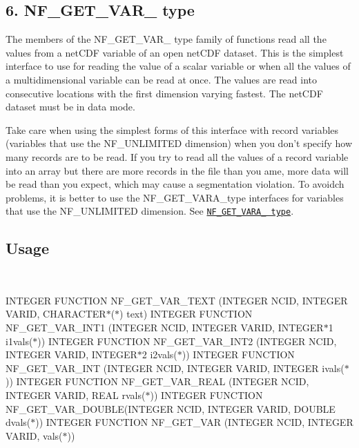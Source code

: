 \subsection*{6. N\+F\+\_\+\+G\+E\+T\+\_\+\+V\+A\+R\+\_\+ type }

The members of the N\+F\+\_\+\+G\+E\+T\+\_\+\+V\+A\+R\+\_\+ type family of functions read all the values from a net\+C\+DF variable of an open net\+C\+DF dataset. This is the simplest interface to use for reading the value of a scalar variable or when all the values of a multidimensional variable can be read at once. The values are read into consecutive locations with the first dimension varying fastest. The net\+C\+DF dataset must be in data mode.

Take care when using the simplest forms of this interface with record variables (variables that use the N\+F\+\_\+\+U\+N\+L\+I\+M\+I\+T\+ED dimension) when you don’t specify how many records are to be read. If you try to read all the values of a record variable into an array but there are more records in the file than you ame, more data will be read than you expect, which may cause a segmentation violation. To avoidch problems, it is better to use the N\+F\+\_\+\+G\+E\+T\+\_\+\+V\+A\+R\+A\+\_\+type interfaces for variables that use the N\+F\+\_\+\+U\+N\+L\+I\+M\+I\+T\+ED dimension. See \href{#NF_005fGET_005fVARA_005f-type}{\tt N\+F\+\_\+\+G\+E\+T\+\_\+\+V\+A\+R\+A\+\_\+ type}.

\subsection*{Usage }

 

I\+N\+T\+E\+G\+ER F\+U\+N\+C\+T\+I\+ON N\+F\+\_\+\+G\+E\+T\+\_\+\+V\+A\+R\+\_\+\+T\+E\+XT (I\+N\+T\+E\+G\+ER N\+C\+ID, I\+N\+T\+E\+G\+ER V\+A\+R\+ID, C\+H\+A\+R\+A\+C\+T\+E\+R$\ast$($\ast$) text) I\+N\+T\+E\+G\+ER F\+U\+N\+C\+T\+I\+ON N\+F\+\_\+\+G\+E\+T\+\_\+\+V\+A\+R\+\_\+\+I\+N\+T1 (I\+N\+T\+E\+G\+ER N\+C\+ID, I\+N\+T\+E\+G\+ER V\+A\+R\+ID, I\+N\+T\+E\+G\+E\+R$\ast$1 i1vals($\ast$)) I\+N\+T\+E\+G\+ER F\+U\+N\+C\+T\+I\+ON N\+F\+\_\+\+G\+E\+T\+\_\+\+V\+A\+R\+\_\+\+I\+N\+T2 (I\+N\+T\+E\+G\+ER N\+C\+ID, I\+N\+T\+E\+G\+ER V\+A\+R\+ID, I\+N\+T\+E\+G\+E\+R$\ast$2 i2vals($\ast$)) I\+N\+T\+E\+G\+ER F\+U\+N\+C\+T\+I\+ON N\+F\+\_\+\+G\+E\+T\+\_\+\+V\+A\+R\+\_\+\+I\+NT (I\+N\+T\+E\+G\+ER N\+C\+ID, I\+N\+T\+E\+G\+ER V\+A\+R\+ID, I\+N\+T\+E\+G\+ER ivals($\ast$)) I\+N\+T\+E\+G\+ER F\+U\+N\+C\+T\+I\+ON N\+F\+\_\+\+G\+E\+T\+\_\+\+V\+A\+R\+\_\+\+R\+E\+AL (I\+N\+T\+E\+G\+ER N\+C\+ID, I\+N\+T\+E\+G\+ER V\+A\+R\+ID, R\+E\+AL rvals($\ast$)) I\+N\+T\+E\+G\+ER F\+U\+N\+C\+T\+I\+ON N\+F\+\_\+\+G\+E\+T\+\_\+\+V\+A\+R\+\_\+\+D\+O\+U\+B\+LE(I\+N\+T\+E\+G\+ER N\+C\+ID, I\+N\+T\+E\+G\+ER V\+A\+R\+ID, D\+O\+U\+B\+LE dvals($\ast$)) I\+N\+T\+E\+G\+ER F\+U\+N\+C\+T\+I\+ON N\+F\+\_\+\+G\+E\+T\+\_\+\+V\+AR (I\+N\+T\+E\+G\+ER N\+C\+ID, I\+N\+T\+E\+G\+ER V\+A\+R\+ID, vals($\ast$))


